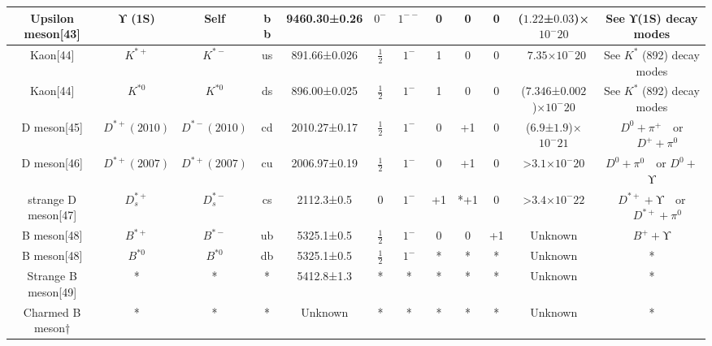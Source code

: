 \begin{table}[ht]
\begin{tabular}{|c|c|c|c|c|c|c|c|c|c|c|c|}
Upsilon meson[43] &ϒ (1S)	 & Self & b b &   9460.30±0.26& $0^-$ & $1^{--}$ &0 & 0 &0& ($1.22$±$0.03$)×$10^-20$ &See ϒ(1S) decay modes\\
\hline
Kaon[44] & $K^{*+}$ & $K^{*-}$  & us &   891.66±0.026 & $\frac{1}{2}$ & $1^-$ & 1 & 0 & 0 & ~$7.35$×$10^-20$ &See $K^*$ (892) decay modes\\
\hline
Kaon[44] & $K^{*0}$ & $K^{*0}$ & ds &  896.00±0.025 & $\frac{1}{2}$ & $1^-$  & 1 & 0 & 0 & ($7.346$±$0.002$)×$10^-20$ & See $K^*$ (892) decay modes\\
\hline
D meson[45] & $D^{*+}(2010)$ & $D^{*-}(2010)$ &cd &	2010.27±0.17   & $\frac{1}{2}$ & $1^-$& 0 & +1 & 0 & ($6.9$±$1.9$)×$10^-21$ & $D^0+\pi^+ \quad$or $\quad D^+ +\pi^0$ \\
\hline
D meson[46] & $D^{*+}(2007)$ & $D^{*+}(2007)$ & cu & 2006.97±0.19& $\frac{1}{2}$ &  $1^-$ & 0 & +1 & 0& >$3.1$×$10^-20$ & $D^0+\pi^0 \quad$or $D^0+$ϒ \\
\hline
strange D meson[47]	 & $D^{*+}_s$ & $D^{*-}_s$ & cs & 2112.3±0.5 & 0& $1^-$ & +1 & *+1& 0 & >$3.4$×$10^-22$& $D^{*+}+\text{ϒ} \quad$or $\quad D^{*+}+\pi^0$ \\
\hline
B meson[48] &$B^{*+}$ & $B^{*-}$ &ub &5325.1±0.5 & $\frac{1}{2}$ & $1^-$& 0 & 0 & +1 & Unknown &$B^+ +$ϒ \\
\hline
B meson[48] &$B^{*0}$ & $B^{*0}$ & db &5325.1±0.5 & $ \frac{1}{2}$&$1^-$ & * & * & * & Unknown & * \\
\hline
Strange B meson[49] & * & * & * &5412.8±1.3 & * & * & * & * & * & Unknown& * \\
\hline
Charmed B meson† & * & * & * & Unknown& * & * & * & * & * & Unknown & * \\
\hline
\end{tabular}
\end{table}